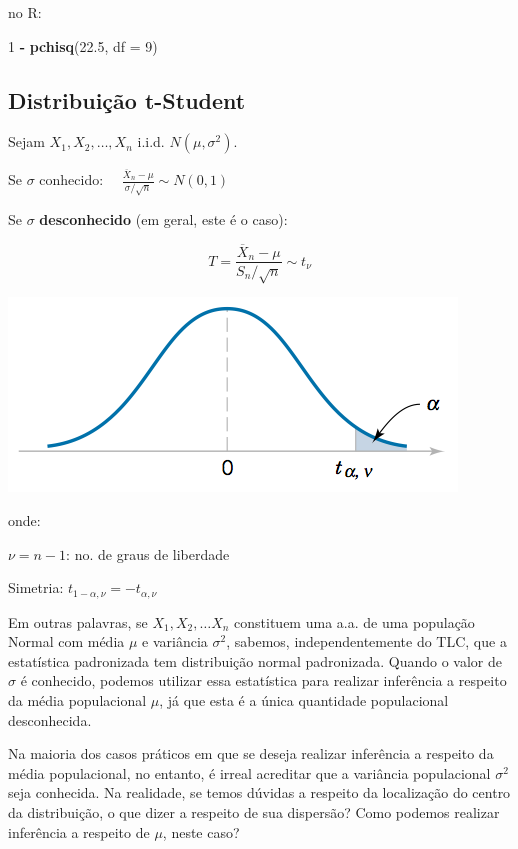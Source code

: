 \documentclass[
]{book}
\newenvironment{Shaded}{\begin{snugshade}}{\end{snugshade}}
\newcommand{\DataTypeTok}[1]{\textcolor[rgb]{0.13,0.29,0.53}{#1}}
\newcommand{\DecValTok}[1]{\textcolor[rgb]{0.00,0.00,0.81}{#1}}
\newcommand{\FloatTok}[1]{\textcolor[rgb]{0.00,0.00,0.81}{#1}}
\newcommand{\KeywordTok}[1]{\textcolor[rgb]{0.13,0.29,0.53}{\textbf{#1}}}
\newcommand{\NormalTok}[1]{#1}
\newcommand{\OperatorTok}[1]{\textcolor[rgb]{0.81,0.36,0.00}{\textbf{#1}}}
\newcommand{\StringTok}[1]{\textcolor[rgb]{0.31,0.60,0.02}{#1}}
\theoremstyle{definition}
\theoremstyle{definition}
\theoremstyle{definition}
\theoremstyle{remark}
\begin{document}
no R:

\begin{Shaded}
\begin{Highlighting}[]
\DecValTok{1} \OperatorTok{-}\StringTok{ }\KeywordTok{pchisq}\NormalTok{(}\FloatTok{22.5}\NormalTok{, }\DataTypeTok{df =} \DecValTok{9}\NormalTok{)  }
\end{Highlighting}
\end{Shaded}

\hypertarget{distribuiuxe7uxe3o-t-student}{%
\subsection*{Distribuição t-Student}\label{distribuiuxe7uxe3o-t-student}}

Sejam \(X_1, X_2, \ldots, X_n\) i.i.d. \(N(\mu, \sigma^2)\).

Se \(\sigma\) conhecido: \(\quad \frac{\overline{X}_n - \mu}{\sigma/\sqrt{n}} \sim N(0,1)\)

Se \(\sigma\) \textbf{desconhecido} (em geral, este é o caso):

\[T = \frac{\overline{X}_n - \mu}{S_n/\sqrt{n}}   \sim t_\nu\]

\begin{center}\includegraphics[width=0.5\linewidth]{img/distr-t-Student} \end{center}

onde:

\(\nu = n-1\): no. de graus de liberdade

Simetria: \(t_{1-\alpha,\nu} = - t_{\alpha, \nu}\)

Em outras palavras, se \(X_1, X_2, \ldots X_n\) constituem uma a.a. de uma população Normal com média \(\mu\) e variância \(\sigma^2\), sabemos, independentemente do TLC, que a estatística padronizada tem distribuição normal padronizada. Quando o valor de \(\sigma\) é conhecido, podemos utilizar essa estatística para realizar inferência a respeito da média populacional \(\mu\), já que esta é a única quantidade populacional desconhecida.

Na maioria dos casos práticos em que se deseja realizar inferência a respeito da média populacional, no entanto, é irreal acreditar que a variância populacional \(\sigma^2\) seja conhecida. Na realidade, se temos dúvidas a respeito da localização do centro da distribuição, o que dizer a respeito de sua dispersão? Como podemos realizar inferência a respeito de \(\mu\), neste caso?
\end{document}
